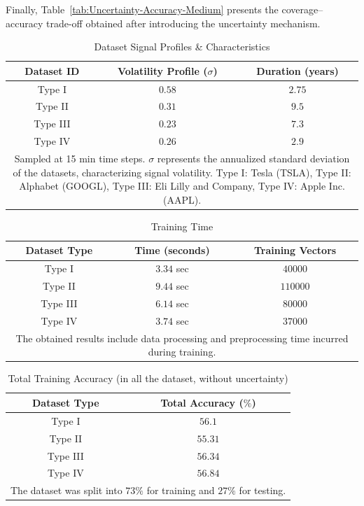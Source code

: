 \documentclass[conference]{IEEEtran}
\begin{document}
Finally, Table~\ref{tab:Uncertainty-Accuracy-Medium} presents the coverage--accuracy trade-off obtained after introducing the uncertainty mechanism.

\begin{table}[H]
    \centering
    \caption{Dataset Signal Profiles \& Characteristics}
    \label{tab:Timestamp-Window-Sequential-Set}
    \begin{tabular}{c c c}
        \hline
        Dataset ID & Volatility Profile ($\sigma$) & Duration (years)\\
        \hline
        Type I & $0.58$ & $2.75$\\
        Type II & $0.31$ & $9.5$\\
        Type III & $0.23$ & $7.3$\\
        Type IV & $0.26$ & $2.9$\\
        \hline
        \multicolumn{3}{p{0.9\linewidth}}{\centering
        Sampled at 15 min time steps. $\sigma$ represents the annualized standard deviation of the datasets, characterizing signal volatility. Type I: Tesla (TSLA), Type II: Alphabet (GOOGL), Type III: Eli Lilly and Company, Type IV: Apple Inc. (AAPL).
        }
    \end{tabular}
\end{table}

\begin{table}[H]
    \centering
    \caption{Training Time}
    \label{tab:Training-Time-Sequential-Set}
    \begin{tabular}{c c c}
        \hline
        Dataset Type & Time (seconds) & Training Vectors\\
        \hline
        Type I & $3.34$ sec & $40000$\\
        Type II & $9.44$ sec & $110000$\\
        Type III & $6.14$ sec & $80000$\\
        Type IV & $3.74$ sec & $37000$\\
        \hline
        \multicolumn{3}{p{0.9\linewidth}}{\centering
        The obtained results include data processing and preprocessing time incurred during training.
        }
    \end{tabular}
\end{table}

\begin{table}[H]
    \centering
    \caption{Total Training Accuracy (in all the dataset, without uncertainty)}
    \label{tab:Total-Accuracy-Sequential-Set}
    \begin{tabular}{c c}
        \hline
        Dataset Type & Total Accuracy ($\%$)\\
        \hline
        Type I & $56.1$\\
        Type II & $55.31$\\
        Type III & $56.34$\\
        Type IV & $56.84$\\
        \hline
        \multicolumn{2}{p{0.9\linewidth}}{\centering
        The dataset was split into $73\%$ for training and $27\%$ for testing.
        }
    \end{tabular}
\end{table}
\end{document}
